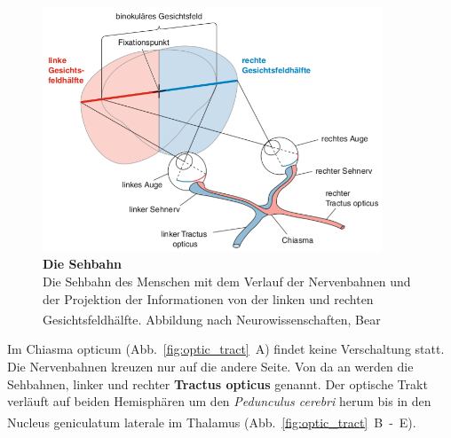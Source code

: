 \documentclass[12pt,a4paper,pdftex]{article}
\begin{document}
\begin{figure}[H]
    \centering
    \includegraphics[width = 0.9\textwidth]{pictures/visual/Sehbahn.png}
    \caption[Die Sehbahn]{\textbf{Die Sehbahn}\\
    Die Sehbahn des Menschen mit dem Verlauf der Nervenbahnen und der Projektion der Informationen von der linken und rechten Gesichtsfeldhälfte.
    Abbildung nach Neurowissenschaften, Bear \textsuperscript{\cite[10]{neurowissenschaften_baer}}}
    \label{fig:sehbahn_baer}
\end{figure}

Im Chiasma opticum (Abb.~\ref{fig:optic_tract}~A) findet keine Verschaltung statt. Die Nervenbahnen kreuzen nur auf die andere Seite. Von da an werden die Sehbahnen, linker und rechter \textbf{Tractus opticus}  genannt. Der optische Trakt verläuft auf beiden Hemisphären um den \textit{Pedunculus cerebri} herum bis in den Nucleus geniculatum laterale im Thalamus (Abb.~\ref{fig:optic_tract}~B~-~E). \textsuperscript{\cite[15]{crossman2014neuroanatomy}}
\end{document}
